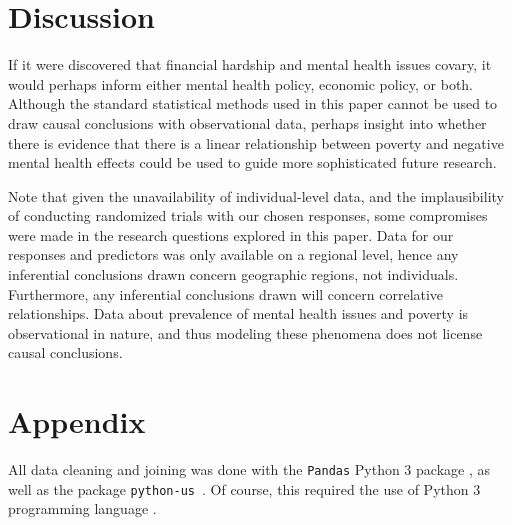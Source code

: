 \documentclass{article}
\begin{document}
\section{Discussion}


If it were discovered that financial hardship and mental
health issues covary, it would perhaps inform
either mental health policy, economic policy, or both.
Although the standard statistical methods used in this paper
cannot be used to draw causal conclusions with observational data,
perhaps insight into whether there is evidence that there
is a linear relationship between poverty and negative mental health effects
could be used to guide more sophisticated future research.

Note that given the unavailability of individual-level data,
and the implausibility of conducting randomized trials with our chosen responses,
some compromises were made in the research questions explored in this paper.
Data for our responses and predictors was only available on a regional level,
hence any inferential conclusions drawn
concern geographic regions, not individuals.
Furthermore, any inferential conclusions drawn will concern correlative
relationships.
Data about prevalence of mental health issues and poverty is observational
in nature, and thus modeling these phenomena does not license causal
conclusions.


\section{Appendix}

All data cleaning and joining was done with the \texttt{Pandas} Python 3 package
\cite{python_pandas}, as well as the package \texttt{python-us}~\cite{python_us}.
Of course, this required the use of Python 3 programming language
\cite{python_lang}.
\end{document}
